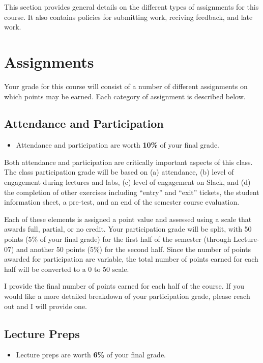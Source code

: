 \documentclass[]{book}
\newenvironment{rmdblock}[1]
  {\begin{shaded*}
  \begin{itemize}
  \renewcommand{\labelitemi}{
    \raisebox{-.7\height}[0pt][0pt]{
      {\setkeys{Gin}{width=3em,keepaspectratio}\texttt{[image: images/\#1]}}
    }
  }
  \item
  }
  {
  \end{itemize}
  \end{shaded*}
  }
\newenvironment{rmdtip}
  {\begin{rmdblock}{tip}}
  {\end{rmdblock}}
\theoremstyle{definition}
\theoremstyle{definition}
\theoremstyle{definition}
\theoremstyle{remark}
\begin{document}
This section provides general details on the different types of
assignments for this course. It also contains policies for submitting
work, reciving feedback, and late work.

\section{Assignments}\label{assignments}

Your grade for this course will consist of a number of different
assignments on which points may be earned. Each category of assignment
is described below.

\subsection{Attendance and
Participation}\label{attendance-and-participation-1}

\begin{rmdtip}
Attendance and participation are worth \textbf{10\%} of your final
grade.
\end{rmdtip}

Both attendance and participation are critically important aspects of
this class. The class participation grade will be based on (a)
attendance, (b) level of engagement during lectures and labs, (c) level
of engagement on Slack, and (d) the completion of other exercises
including ``entry'' and ``exit'' tickets, the student information sheet,
a pre-test, and an end of the semester course evaluation.

Each of these elements is assigned a point value and assessed using a
scale that awards full, partial, or no credit. Your participation grade
will be split, with 50 points (5\% of your final grade) for the first
half of the semester (through Lecture-07) and another 50 points (5\%)
for the second half. Since the number of points awarded for
participation are variable, the total number of points earned for each
half will be converted to a 0 to 50 scale.

I provide the final number of points earned for each half of the course.
If you would like a more detailed breakdown of your participation grade,
please reach out and I will provide one.

\subsection{Lecture Preps}\label{lecture-preps}

\begin{rmdtip}
Lecture preps are worth \textbf{6\%} of your final grade.
\end{rmdtip}
\end{document}
